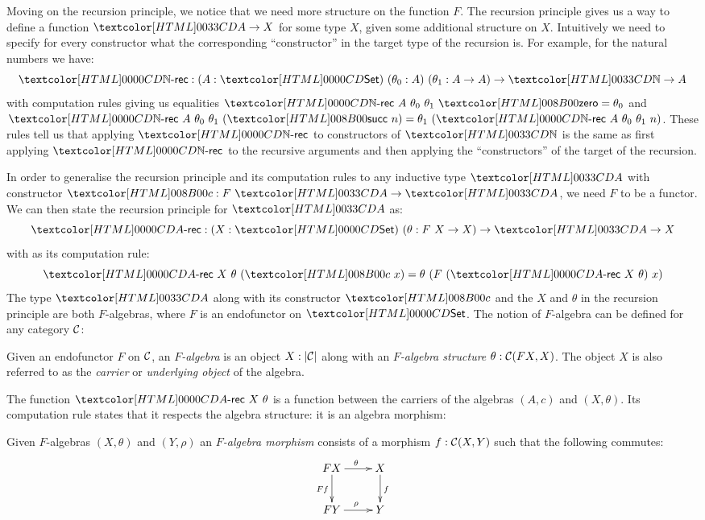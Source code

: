 Moving on the recursion principle, we notice that we need more
structure on the function $F$. The recursion principle gives us a way
to define a function $\Aty \to X$ for some type $X$, given some
additional structure on $X$. Intuitively we need to specify for every
constructor what the corresponding ``constructor'' in the target type
of the recursion is. For example, for the natural numbers we have:
$$
\natrec : (A : \Set)\ (\theta_0 : A)\ (\theta_1 : A \to A) \to \natty \to A
$$
with computation rules giving us equalities
$\natrec\ A\ \theta_0\ \theta_1\ \natzero = \theta_0$ and
$\natrec\ A\ \theta_0\ \theta_1\ (\natsucc\ n) = \theta_1\ (\natrec\
A\ \theta_0\ \theta_1\ n)$.
These rules tell us that applying $\natrec$ to constructors of
$\natty$ is the same as first applying $\natrec$ to the recursive
arguments and then applying the ``constructors'' of the target of the
recursion.

In order to generalise the recursion principle and its computation
rules to any inductive type $\Aty$ with constructor
$\Ac : F\ \Aty \to \Aty$, we need $F$ to be a functor. We can then
state the recursion principle for $\Aty$ as:
$$
\Arec : (X : \Set)\ (\theta : F\ X \to X) \to \Aty \to X
$$
with as its computation rule:
$$
\Arec\ X\ \theta\ (\Ac\ x) = \theta\ (F\ (\Arec\ X\ \theta)\ x)
$$
The type $\Aty$ along with its constructor $\Ac$ and the $X$ and
$\theta$ in the recursion principle are both $F$-algebras, where $F$
is an endofunctor on $\Set$. The notion of $F$-algebra can be defined
for any category $\mathcal{C}$:

\begin{definition}
  Given an endofunctor $F$ on $\mathcal{C}$, an \emph{$F$-algebra} is an
  object $X : | \mathcal{C} |$ along with an \emph{$F$-algebra structure}
  $\theta : \mathcal{C}(F X, X)$. The object $X$ is also referred to as the
  \emph{carrier} or \emph{underlying object} of the algebra.
\end{definition}

The function $\Arec\ X\ \theta$ is a function between the carriers of
the algebras $(A,c)$ and $(X,\theta)$. Its computation rule states
that it respects the algebra structure: it is an algebra morphism:

\begin{definition}
  Given $F$-algebras $(X,\theta)$ and $(Y,\rho)$ an \emph{$F$-algebra
    morphism} consists of a morphism $f : \mathcal{C}(X,Y)$ such that the
  following commutes:
  $$
  \xymatrix{
    FX \ar[r]^{\theta} \ar[d]_{Ff} &X \ar[d]^{f} \\
    FY \ar[r]^{\rho} &Y
  }
  $$
\end{definition}

